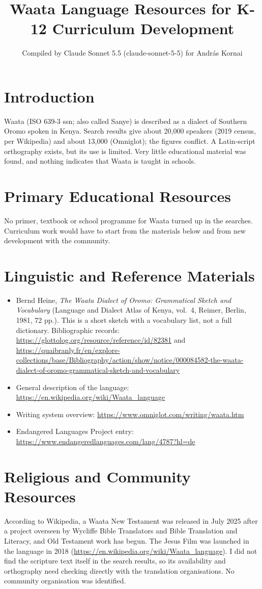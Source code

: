 \documentclass[12pt]{article}
\title{Waata Language Resources for K-12 Curriculum Development}
\author{Compiled by Claude Sonnet 5.5 (claude-sonnet-5-5) for Andr\'as Kornai}
\date{}
\begin{document}
\maketitle

\section{Introduction}
Waata (ISO 639-3 ssn; also called Sanye) is described as a dialect of Southern Oromo spoken in Kenya. Search results give about 20,000 speakers (2019 census, per Wikipedia) and about 13,000 (Omniglot); the figures conflict. A Latin-script orthography exists, but its use is limited. Very little educational material was found, and nothing indicates that Waata is taught in schools.

\section{Primary Educational Resources}
No primer, textbook or school programme for Waata turned up in the searches. Curriculum work would have to start from the materials below and from new development with the community.

\section{Linguistic and Reference Materials}
\begin{itemize}
\item Bernd Heine, \emph{The Waata Dialect of Oromo: Grammatical Sketch and Vocabulary} (Language and Dialect Atlas of Kenya, vol.\ 4, Reimer, Berlin, 1981, 72 pp.). This is a short sketch with a vocabulary list, not a full dictionary. Bibliographic records: \url{https://glottolog.org/resource/reference/id/82381} and \url{https://quaibranly.fr/en/explore-collections/base/Bibliography/action/show/notice/000084582-the-waata-dialect-of-oromo-grammatical-sketch-and-vocabulary}
\item General description of the language: \url{https://en.wikipedia.org/wiki/Waata_language}
\item Writing system overview: \url{https://www.omniglot.com/writing/waata.htm}
\item Endangered Languages Project entry: \url{https://www.endangeredlanguages.com/lang/4787?hl=de}
\end{itemize}

\section{Religious and Community Resources}
According to Wikipedia, a Waata New Testament was released in July 2025 after a project overseen by Wycliffe Bible Translators and Bible Translation and Literacy, and Old Testament work has begun. The Jesus Film was launched in the language in 2018 (\url{https://en.wikipedia.org/wiki/Waata_language}). I did not find the scripture text itself in the search results, so its availability and orthography need checking directly with the translation organisations. No community organisation was identified.
\end{document}
